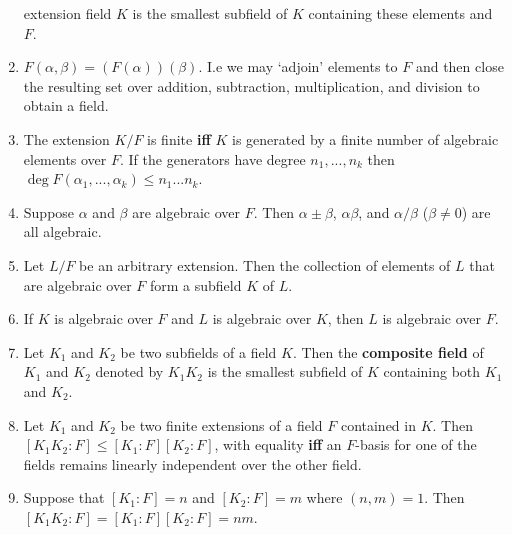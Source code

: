 \documentclass{article}
\begin{document}
\begin{enumerate}[1.]
        extension field $K$ is the smallest subfield of $K$ containing these
        elements and $F$.
    \item $F(\alpha, \beta) = (F(\alpha))(\beta)$. I.e we may `adjoin'
        elements to $F$ and then close the resulting set over addition,
        subtraction, multiplication, and division to obtain a field.
    \item The extension $K/F$ is finite \textbf{iff} $K$ is generated by a
        finite number of algebraic elements over $F$. If the generators have
        degree $n_1, ..., n_k$ then $\deg F(\alpha_1, ..., \alpha_k) \leq
        n_1...n_k$.
    \item Suppose $\alpha$ and $\beta$ are algebraic over $F$. Then $\alpha
        \pm \beta$, $\alpha\beta$, and $\alpha/\beta$ ($\beta \not= 0$) are
        all algebraic.
    \item Let $L/F$ be an arbitrary extension. Then the collection of
        elements of $L$ that are algebraic over $F$ form a subfield $K$ of
        $L$.
    \item If $K$ is algebraic over $F$ and $L$ is algebraic over $K$, then
        $L$ is algebraic over $F$.
    \item Let $K_1$ and $K_2$ be two subfields of a field $K$. Then the
        \textbf{composite field} of $K_1$ and $K_2$ denoted by $K_1K_2$ is
        the smallest subfield of $K$ containing both $K_1$ and $K_2$.
    \item Let $K_1$ and $K_2$ be two finite extensions of a field $F$
        contained in $K$. Then $[K_1K_2 : F] \leq [K_1 : F][K_2 : F]$, with
        equality \textbf{iff} an $F$-basis for one of the fields remains
        linearly independent over the other field.
    \item Suppose that $[K_1 : F] = n$ and $[K_2 : F] = m$ where $(n, m) =
        1$. Then $[K_1K_2 : F] = [K_1 : F][K_2 : F] = nm$.
\end{enumerate}
\end{document}
